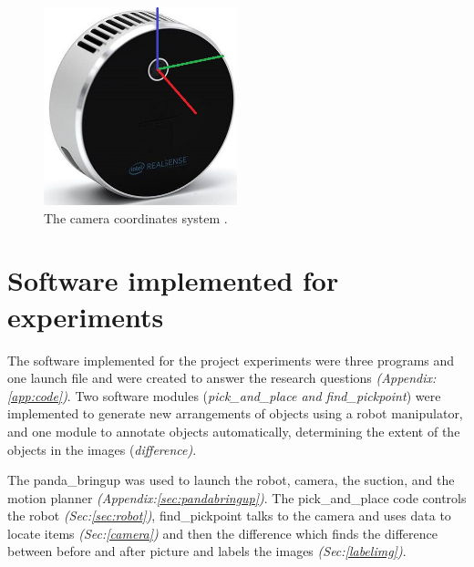 \begin{figure}[h]
 \centering
 \includegraphics[width=0.5\textwidth]{graphics/lidar515.jpg}
 \caption{The camera coordinates system \cite{noauthor_intel_nodate}.}
 \label{fig:l515cor}
\end{figure}
\clearpage

\section{Software implemented for experiments}
The software implemented for the project experiments were three programs and one launch file and were created to answer the research questions \textit{(Appendix: \ref{app:code})}. Two software modules (\textit{pick\_and\_place and find\_pickpoint}) were implemented to generate new arrangements of objects using a robot manipulator, and one module to annotate objects automatically, determining the extent of the objects in the images (\textit{difference)}.

The panda\_bringup was used to launch the robot, camera, the suction, and the motion planner \textit{(Appendix:\ref{sec:pandabringup})}. 
The pick\_and\_place code controls the robot \textit{(Sec:\ref{sec:robot})}, 
find\_pickpoint talks to the camera and uses data to locate items \textit{(Sec:\ref{camera})} and then the difference which finds the difference between before and after picture and labels the images \textit{(Sec:\ref{labelimg})}.


